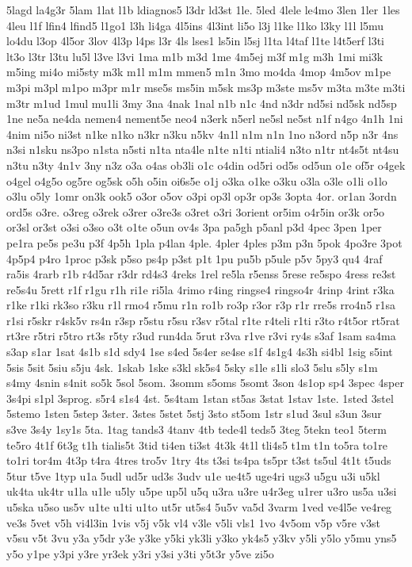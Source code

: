 {5lagd
la4g3r
5lam
1lat
l1b
ldiagnos5
l3dr
ld3st
1le.
5led
4lele
le4mo
3len
1ler
1les
4leu
l1f
lfin4
lfind5
l1go1
l3h
li4ga
4l5ins
4l3int
li5o
l3j
l1ke
l1ko
l3ky
l1l
l5mu
lo4du
l3op
4l5or
3lov
4l3p
l4ps
l3r
4ls
lses1
ls5in
l5sj
l1ta
l4taf
l1te
l4t5erf
l3ti
lt3o
l3tr
l3tu
lu5l
l3ve
l3vi
1ma
m1b
m3d
1me
4m5ej
m3f
m1g
m3h
1mi
mi3k
m5ing
mi4o
mi5sty
m3k
m1l
m1m
mmen5
m1n
3mo
mo4da
4mop
4m5ov
m1pe
m3pi
m3pl
m1po
m3pr
m1r
mse5s
ms5in
m5sk
ms3p
m3ste
ms5v
m3ta
m3te
m3ti
m3tr
m1ud
1mul
mu1li
3my
3na
4nak
1nal
n1b
n1c
4nd
n3dr
nd5si
nd5sk
nd5sp
1ne
ne5a
ne4da
nemen4
nement5e
neo4
n3erk
n5erl
ne5sl
ne5st
n1f
n4go
4n1h
1ni
4nim
ni5o
ni3st
n1ke
n1ko
n3kr
n3ku
n5kv
4n1l
n1m
n1n
1no
n3ord
n5p
n3r
4ns
n3si
n1sku
ns3po
n1sta
n5sti
n1ta
nta4le
n1te
n1ti
ntiali4
n3to
n1tr
nt4s5t
nt4su
n3tu
n3ty
4n1v
3ny
n3z
o3a
o4as
ob3li
o1c
o4din
od5ri
od5s
od5un
o1e
of5r
o4gek
o4gel
o4g5o
og5re
og5sk
o5h
o5in
oi6s5e
o1j
o3ka
o1ke
o3ku
o3la
o3le
o1li
o1lo
o3lu
o5ly
1omr
on3k
ook5
o3or
o5ov
o3pi
op3l
op3r
op3s
3opta
4or.
or1an
3ordn
ord5s
o3re.
o3reg
o3rek
o3rer
o3re3s
o3ret
o3ri
3orient
or5im
o4r5in
or3k
or5o
or3sl
or3st
o3si
o3so
o3t
o1te
o5un
ov4s
3pa
pa5gh
p5anl
p3d
4pec
3pen
1per
pe1ra
pe5s
pe3u
p3f
4p5h
1pla
p4lan
4ple.
4pler
4ples
p3m
p3n
5pok
4po3re
3pot
4p5p4
p4ro
1proc
p3sk
p5so
ps4p
p3st
p1t
1pu
pu5b
p5ule
p5v
5py3
qu4
4raf
ra5is
4rarb
r1b
r4d5ar
r3dr
rd4s3
4reks
1rel
re5la
r5enss
5rese
re5spo
4ress
re3st
re5s4u
5rett
r1f
r1gu
r1h
ri1e
ri5la
4rimo
r4ing
ringse4
ringso4r
4rinp
4rint
r3ka
r1ke
r1ki
rk3so
r3ku
r1l
rmo4
r5mu
r1n
ro1b
ro3p
r3or
r3p
r1r
rre5s
rro4n5
r1sa
r1si
r5skr
r4sk5v
rs4n
r3sp
r5stu
r5su
r3sv
r5tal
r1te
r4teli
r1ti
r3to
r4t5or
rt5rat
rt3re
r5tri
r5tro
rt3s
r5ty
r3ud
run4da
5rut
r3va
r1ve
r3vi
ry4s
s3af
1sam
sa4ma
s3ap
s1ar
1sat
4s1b
s1d
sdy4
1se
s4ed
5s4er
se4se
s1f
4s1g4
4s3h
si4bl
1sig
s5int
5sis
5sit
5siu
s5ju
4sk.
1skab
1ske
s3kl
sk5s4
5sky
s1le
s1li
slo3
5slu
s5ly
s1m
s4my
4snin
s4nit
so5k
5sol
5som.
3somm
s5oms
5somt
3son
4s1op
sp4
3spec
4sper
3s4pi
s1pl
3sprog.
s5r4
s1s4
4st.
5s4tam
1stan
st5as
3stat
1stav
1ste.
1sted
3stel
5stemo
1sten
5step
3ster.
3stes
5stet
5stj
3sto
st5om
1str
s1ud
3sul
s3un
3sur
s3ve
3s4y
1sy1s
5ta.
1tag
tands3
4tanv
4tb
tede4l
teds5
3teg
5tekn
teo1
5term
te5ro
4t1f
6t3g
t1h
tialis5t
3tid
ti4en
ti3st
4t3k
4t1l
tli4s5
t1m
t1n
to5ra
to1re
to1ri
tor4m
4t3p
t4ra
4tres
tro5v
1try
4ts
t3si
ts4pa
ts5pr
t3st
ts5ul
4t1t
t5uds
5tur
t5ve
1typ
u1a
5udl
ud5r
ud3s
3udv
u1e
ue4t5
uge4ri
ugs3
u5gu
u3i
u5kl
uk4ta
uk4tr
u1la
u1le
u5ly
u5pe
up5l
u5q
u3ra
u3re
u4r3eg
u1rer
u3ro
us5a
u3si
u5ska
u5so
us5v
u1te
u1ti
u1to
ut5r
ut5s4
5u5v
va5d
3varm
1ved
ve4l5e
ve4reg
ve3s
5vet
v5h
vi4l3in
1vis
v5j
v5k
vl4
v3le
v5li
vls1
1vo
4v5om
v5p
v5re
v3st
v5su
v5t
3vu
y3a
y5dr
y3e
y3ke
y5ki
yk3li
y3ko
yk4s5
y3kv
y5li
y5lo
y5mu
yns5
y5o
y1pe
y3pi
y3re
yr3ek
y3ri
y3si
y3ti
y5t3r
y5ve
zi5o
}
